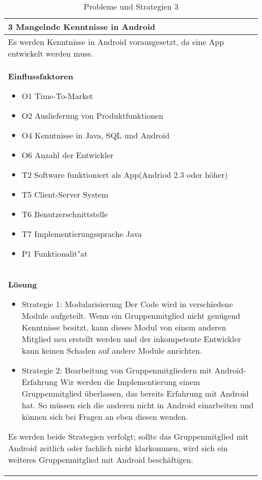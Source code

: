 \begin{table}[H]
\caption{Probleme und Strategien 3}
\begin{tabular}{|p{\textwidth}|}\hline
3 Mangelnde Kenntnisse in Android\\ \hline
Es werden Kenntnisse in Android vorausgesetzt, da eine App entwickelt werden muss. \\ \hline
\textbf{Einflussfaktoren}
\begin{itemize}
\item O1 Time-To-Market
\item O2 Auslieferung von Produktfunktionen
\item O4 Kenntnisse in Java, SQL und Android
\item O6 Anzahl der Entwickler
\item T2 Software funktioniert als App(Andriod 2.3 oder höher)
\item T5 Client-Server System
\item T6 Benutzerschnittstelle
\item T7 Implementierungssprache Java
\item P1 Funktionalit"at
\end{itemize}\\ \hline
\textbf{Lösung}
\begin{itemize}
\item Strategie 1: Modularisierung \leavevmode\newline
Der Code wird in verschiedene Module aufgeteilt. Wenn ein Gruppenmitglied nicht genügend Kenntnisse besitzt, kann dieses Modul von einem anderen Mitglied neu erstellt werden und der inkompetente Entwickler kann keinen Schaden auf andere Module anrichten.
\item Strategie 2: Bearbeitung von Gruppenmitgliedern mit Android-Erfahrung \leavevmode\newline
Wir werden die Implementierung einem Gruppenmitglied überlassen, das bereits Erfahrung mit Android hat. So müssen sich die anderen nicht in Android einarbeiten und können sich bei Fragen an eben diesen wenden.
\end{itemize}
Es werden beide Strategien verfolgt; sollte das Gruppenmitglied mit Android zeitlich oder fachlich nicht klarkommen, wird sich ein weiteres Gruppenmitglied mit Android beschäftigen. \\ \hline
\end{tabular}
\end{table}

